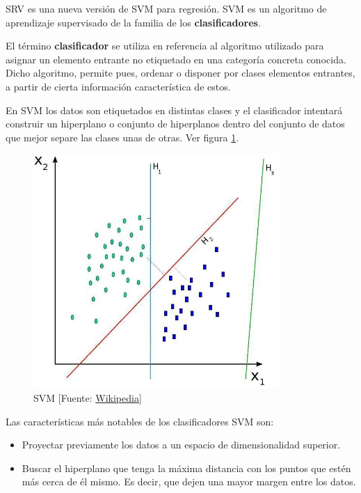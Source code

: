 	SRV es una nueva versión de SVM para regresión. SVM es un algoritmo de aprendizaje supervisado de la familia de los \textbf{clasificadores}.

	El término \textbf{clasificador} se utiliza en referencia al algoritmo utilizado para asignar un elemento entrante no etiquetado en una categoría concreta conocida. Dicho algoritmo, permite pues, ordenar o disponer por clases elementos entrantes, a partir de cierta información característica de estos.

	En SVM los datos son etiquetados en distintas clases y el clasificador intentará construir un hiperplano o conjunto de hiperplanos dentro del conjunto de datos que mejor separe las clases unas de otras. Ver figura \ref{svm}.

	\begin{figure}[htb]
		
		\begin{center}
			\includegraphics[height=3.5in]{figures/svm.jpg}
			\caption{SVM [Fuente: \href{www.wikipedia.org}{Wikipedia}]}
		\end{center}
		\label{svm}
	\end{figure}

	Las características más notables de los clasificadores SVM son:
	\begin{itemize}
		\item Proyectar previamente los datos a un espacio de dimensionalidad superior.
		\item Buscar el hiperplano que tenga la máxima distancia con los puntos que estén más cerca de él mismo. Es decir, que dejen una mayor margen entre los datos.
	\end{itemize}

